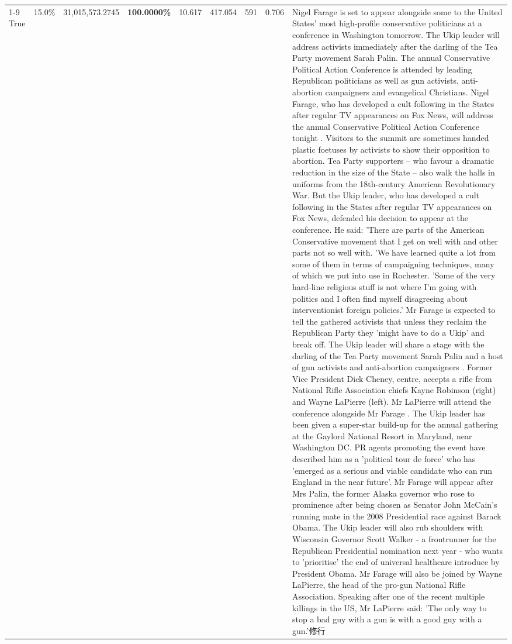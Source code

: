 \begin{table}[H]
\begin{tabular}{lllrlllll}
\cline{1-9}
True & 15.0\% & 31,015,573.2745 & \bfseries \color{red} 100.0000\% & 10.617 & 417.054 & 591 & 0.706 & Nigel Farage is set to appear alongside some to the United States' most high-profile conservative politicians at a conference in Washington tomorrow. The Ukip leader will address activists immediately after the darling of the Tea Party movement Sarah Palin. The annual Conservative Political Action Conference is attended by leading Republican politicians as well as gun activists, anti-abortion campaigners and evangelical Christians. Nigel Farage, who has developed a cult following in the States after regular TV appearances on Fox News, will address the annual Conservative Political Action Conference tonight . Visitors to the summit are sometimes handed plastic foetuses by activists to show their opposition to abortion. Tea Party supporters – who favour a dramatic reduction in the size of the State – also walk the halls in uniforms from the 18th-century American Revolutionary War. But the Ukip leader, who has developed a cult following in the States after regular TV appearances on Fox News, defended his decision to appear at the conference. He said: 'There are parts of the American Conservative movement that I get on well with and other parts not so well with. 'We have learned quite a lot from some of them in terms of campaigning techniques, many of which we put into use in Rochester. 'Some of the very hard-line religious stuff is not where I'm going with politics and I often find myself disagreeing about interventionist foreign policies.' Mr Farage is expected to tell the gathered activists that unless they reclaim the Republican Party they 'might have to do a Ukip' and break off. The Ukip leader will share a stage with the darling of the Tea Party movement Sarah Palin and a host of gun activists and anti-abortion campaigners . Former Vice President Dick Cheney, centre, accepts a rifle from National Rifle Association chiefs Kayne Robinson (right) and Wayne LaPierre (left). Mr LaPierre will attend the conference alongside Mr Farage . The Ukip leader has been given a super-star build-up for the annual gathering at the Gaylord National Resort in Maryland, near Washington DC. PR agents promoting the event have described him as a 'political tour de force' who has 'emerged as a serious and viable candidate who can run England in the near future'. Mr Farage will appear after Mrs Palin, the former Alaska governor who rose to prominence after being chosen as Senator John McCain's running mate in the 2008 Presidential race against Barack Obama. The Ukip leader will also rub shoulders with Wisconsin Governor Scott Walker - a frontrunner for the Republican Presidential nomination next year - who wants to 'prioritise' the end of universal healthcare introduce by President Obama. Mr Farage will also be joined by Wayne LaPierre, the head of the pro-gun National Rifle Association. Speaking after one of the recent multiple killings in the US, Mr LaPierre said: 'The only way to stop a bad guy with a gun is with a good guy with a gun.'修行 \\

\end{tabular}
\end{table}
